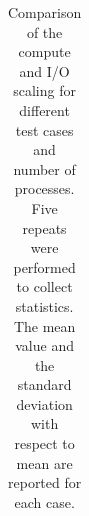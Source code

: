 \begin{table}
\begin{adjustbox}{max width=\textwidth}
\begin{tabular}{c c c c c c c c c c c c}
  \bottomrule
\end{tabular}
\end{adjustbox}
\caption[Notation of our performance modeling]
{Comparison of the compute and I/O scaling for different test cases and number of processes. Five repeats were performed to collect statistics. The mean value and the
standard deviation with respect to mean are reported for each case.}
\label{tab:comp-IO-scaling}
\end{table}

